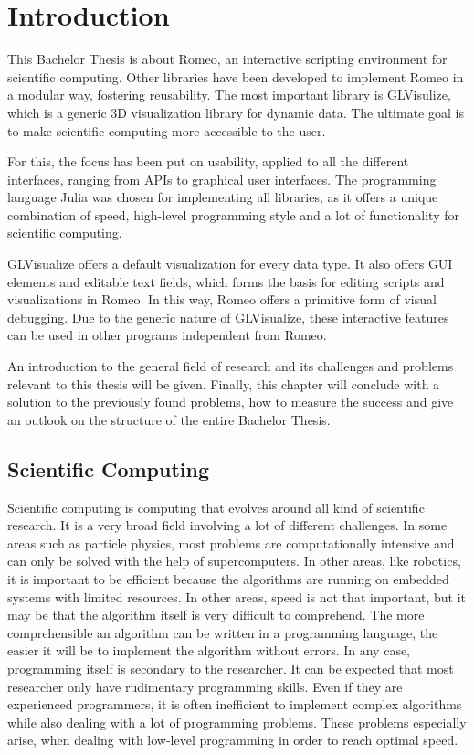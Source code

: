 \section{Introduction}
This Bachelor Thesis is about Romeo, an interactive scripting environment for scientific computing.
Other libraries have been developed to implement Romeo in a modular way, fostering reusability.
The most important library is GLVisulize, which is a generic 3D visualization library for dynamic data. 
The ultimate goal is to make scientific computing more accessible to the user. 

For this, the focus has been put on usability, applied to all the different interfaces, ranging from \ac{API}s to graphical user interfaces. 
The programming language Julia was chosen for implementing all libraries, as it offers a unique combination of speed, high-level programming style and a lot of functionality for scientific computing.

GLVisualize offers a default visualization for every data type. 
It also offers \ac{GUI} elements and editable text fields, which forms the basis for editing scripts and visualizations in Romeo. 
In this way, Romeo offers a primitive form of visual debugging. 
Due to the generic nature of GLVisualize, these interactive features can be used in other programs independent from Romeo.

An introduction to the general field of research and its challenges and problems relevant to this thesis will be given.
Finally, this chapter will conclude with a solution to the previously found problems, how to measure the success and give an outlook on the structure of the entire Bachelor Thesis.


\subsection{Scientific Computing}

Scientific computing is computing that evolves around all kind of scientific research.
It is a very broad field involving a lot of different challenges. 
In some areas such as particle physics, most problems are computationally intensive and can only be solved with the help of supercomputers.
In other areas, like robotics, it is important to be efficient because the algorithms are running on embedded systems with limited resources. 
In other areas, speed is not that important, but it may be that the algorithm itself is very difficult to comprehend. 
The more comprehensible an algorithm can be written in a programming language, the easier it will be to implement the algorithm without errors.
In any case, programming itself is secondary to the researcher.
It can be expected that most researcher only have rudimentary programming skills. 
Even if they are experienced programmers, it is often inefficient to implement complex algorithms while also dealing with a lot of programming problems.
These problems especially arise, when dealing with low-level programming in order to reach optimal speed.

